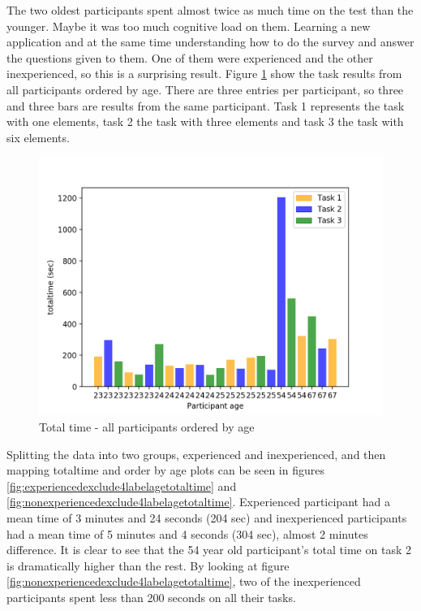 The two oldest participants spent almost twice as much time on the test than the younger. Maybe it was too much cognitive load on them. Learning a new application and at the same time understanding how to do the survey and answer the questions given to them. One of them were experienced and the other inexperienced, so this is a surprising result. Figure \ref{fig:allparticipantssortedageparticipantexclude4labelage} show the task results from all participants ordered by age. There are three entries per participant, so three and three bars are results from the same participant. Task 1 represents the task with one elements, task 2 the task with three elements and task 3 the task with six elements.

\begin{figure}[H]
	\centering
	\includegraphics[width=0.7\linewidth]{fig/allParticipants_sorted_Age_Participant_exclude4_labelage}
	\caption[Total time, all]{Total time - all participants ordered by age}
	\label{fig:allparticipantssortedageparticipantexclude4labelage}
\end{figure}

Splitting the data into two groups, experienced and inexperienced, and then mapping totaltime and order by age plots can be seen in figures \ref{fig:experiencedexclude4labelagetotaltime} and \ref{fig:nonexperiencedexclude4labelagetotaltime}. Experienced participant had a mean time of 3 minutes and 24 seconds (204 sec) and inexperienced participants had a mean time of 5 minutes and 4 seconds (304 sec), almost 2 minutes difference. It is clear to see that the 54 year old participant's total time on task 2 is dramatically higher than the rest. By looking at figure \ref{fig:nonexperiencedexclude4labelagetotaltime}, two of the inexperienced participants spent less than 200 seconds on all their tasks.  

